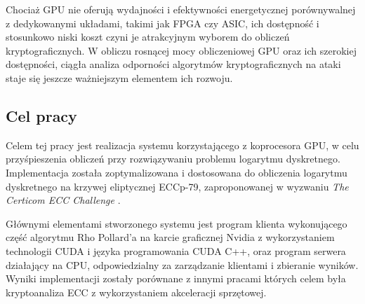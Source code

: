 Chociaż GPU nie oferują wydajności i efektywności energetycznej 
porównywalnej z dedykowanymi układami, takimi jak FPGA czy ASIC, ich dostępność 
i stosunkowo niski koszt czyni je atrakcyjnym wyborem do obliczeń kryptograficznych. 
W obliczu rosnącej mocy obliczeniowej GPU oraz ich szerokiej dostępności, ciągła 
analiza odporności algorytmów kryptograficznych na ataki staje się jeszcze 
ważniejszym elementem ich rozwoju.

\subsection{Cel pracy}
Celem tej pracy jest realizacja systemu korzystającego z koprocesora GPU,
w celu przyśpieszenia obliczeń przy
rozwiązywaniu problemu logarytmu dyskretnego.
Implementacja została zoptymalizowana i dostosowana do obliczenia logarytmu
dyskretnego na krzywej eliptycznej ECCp-79, zaproponowanej w wyzwaniu \textit{The Certicom ECC Challenge} \cite{certicom-challange}.
\par
Głównymi elementami stworzonego systemu
jest program klienta wykonującego część algorytmu Rho Pollard'a na karcie graficznej Nvidia
z wykorzystaniem technologii CUDA i języka programowania CUDA C++,
oraz program serwera działający na CPU, odpowiedzialny za zarządzanie klientami i zbieranie wyników.
 Wyniki implementacji zostały porównane z innymi pracami
których celem była kryptoanaliza ECC z wykorzystaniem akceleracji sprzętowej.